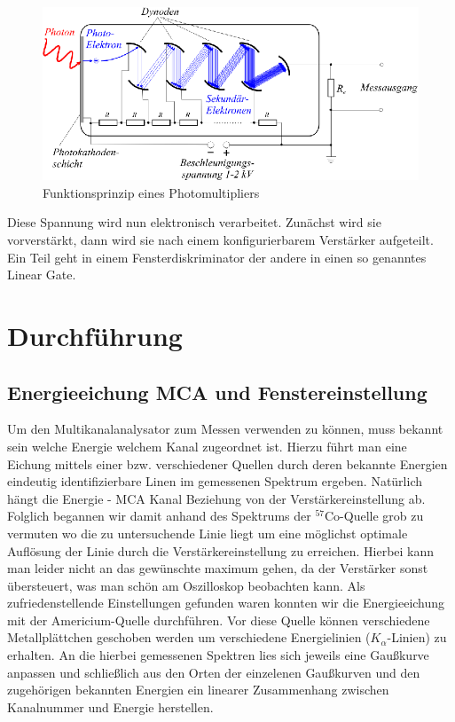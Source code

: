 \documentclass[12pt]{article}
\begin{document}
\begin{figure}[H]
 \includegraphics[width=0.9\linewidth]{pictures/photomultiplier_schema.eps}
 \caption{Funktionsprinzip eines Photomultipliers}
\end{figure}

Diese Spannung wird nun elektronisch verarbeitet. Zunächst wird sie vorverstärkt, dann wird sie nach einem konfigurierbarem Verstärker aufgeteilt. Ein Teil geht in einem Fensterdiskriminator der andere in einen so genanntes Linear Gate. 
\section{Durchführung}
\subsection{Energieeichung MCA und Fenstereinstellung}
Um den Multikanalanalysator zum Messen verwenden zu können, muss bekannt sein welche Energie welchem Kanal zugeordnet ist. Hierzu führt man eine Eichung mittels einer bzw. verschiedener
Quellen durch deren bekannte Energien eindeutig identifizierbare Linen im gemessenen Spektrum ergeben. Natürlich hängt die Energie - MCA Kanal Beziehung von der Verstärkereinstellung ab.
Folglich begannen wir damit anhand des Spektrums der $^{57}$Co-Quelle grob zu vermuten wo die zu untersuchende Linie liegt um eine möglichst optimale Auflösung der Linie durch die
Verstärkereinstellung zu erreichen. Hierbei kann man leider nicht an das gewünschte maximum gehen, da der Verstärker sonst übersteuert, was man schön am Oszilloskop beobachten kann.
Als zufriedenstellende Einstellungen gefunden waren konnten wir die Energieeichung mit der Americium-Quelle durchführen. Vor diese Quelle können verschiedene Metallplättchen geschoben
werden um verschiedene Energielinien ($K_\alpha$-Linien) zu erhalten. An die hierbei gemessenen Spektren lies sich jeweils eine Gaußkurve anpassen und schließlich aus den Orten der
einzelenen Gaußkurven und den zugehörigen bekannten Energien ein linearer Zusammenhang zwischen Kanalnummer und Energie herstellen.\\
\end{document}

